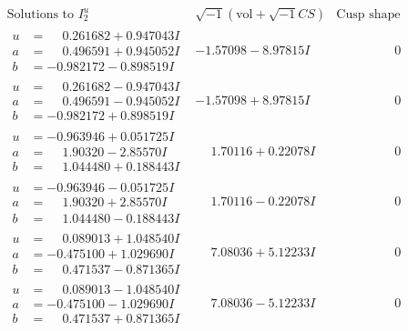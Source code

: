 \documentclass[1p]{elsarticle_modified}
\theoremstyle{definition}
\newcommand{\I}{\sqrt{-1}}
\begin{document}
$$\begin{array}{c|c|c}  
\text{Solutions to }I^u_{2}& \I (\text{vol} + \sqrt{-1}CS) & \text{Cusp shape}\\
 \hline 
\begin{aligned}
u &= \phantom{-}0.261682 + 0.947043 I \\
a &= \phantom{-}0.496591 + 0.945052 I \\
b &= -0.982172 - 0.898519 I\end{aligned}
 & -1.57098 - 8.97815 I & \phantom{-0.000000 } 0 \\ \hline\begin{aligned}
u &= \phantom{-}0.261682 - 0.947043 I \\
a &= \phantom{-}0.496591 - 0.945052 I \\
b &= -0.982172 + 0.898519 I\end{aligned}
 & -1.57098 + 8.97815 I & \phantom{-0.000000 } 0 \\ \hline\begin{aligned}
u &= -0.963946 + 0.051725 I \\
a &= \phantom{-}1.90320 - 2.85570 I \\
b &= \phantom{-}1.044480 + 0.188443 I\end{aligned}
 & \phantom{-}1.70116 + 0.22078 I & \phantom{-0.000000 } 0 \\ \hline\begin{aligned}
u &= -0.963946 - 0.051725 I \\
a &= \phantom{-}1.90320 + 2.85570 I \\
b &= \phantom{-}1.044480 - 0.188443 I\end{aligned}
 & \phantom{-}1.70116 - 0.22078 I & \phantom{-0.000000 } 0 \\ \hline\begin{aligned}
u &= \phantom{-}0.089013 + 1.048540 I \\
a &= -0.475100 + 1.029690 I \\
b &= \phantom{-}0.471537 - 0.871365 I\end{aligned}
 & \phantom{-}7.08036 + 5.12233 I & \phantom{-0.000000 } 0 \\ \hline\begin{aligned}
u &= \phantom{-}0.089013 - 1.048540 I \\
a &= -0.475100 - 1.029690 I \\
b &= \phantom{-}0.471537 + 0.871365 I\end{aligned}
 & \phantom{-}7.08036 - 5.12233 I & \phantom{-0.000000 } 0 \\ \hline\begin{aligned}

\end{aligned}
\end{array}$$
\end{document}
